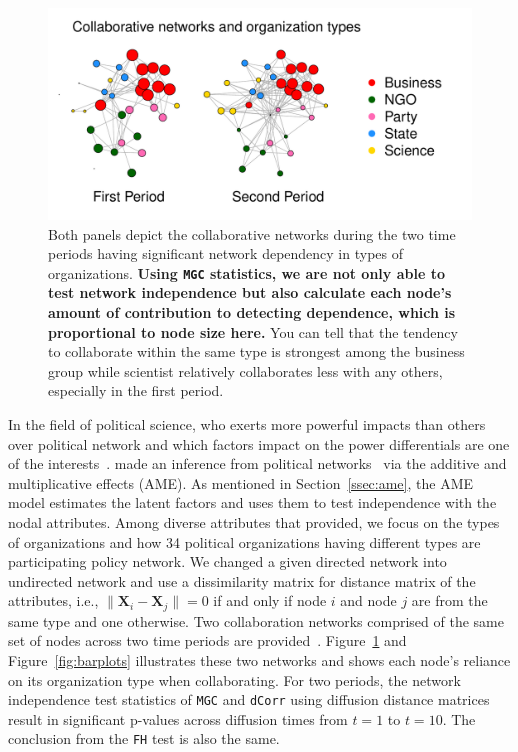 \documentclass[12pt]{article}
\theoremstyle{definition}
\begin{document}
\begin{figure}[H]
	\centering
	\includegraphics[width=\linewidth]{../../Figure/two_politics.pdf}
	\caption{Both panels depict the collaborative networks during the two time periods having significant network dependency in types of organizations. \textbf{Using \texttt{MGC} statistics, we are not only able to test network independence but also calculate each node's amount of contribution to detecting dependence, which is proportional to node size here.} You can tell that the tendency to collaborate within the same type is strongest among the business group while scientist relatively collaborates less with any others, especially in the first period.}
	\label{fig:politics}
\end{figure}
	
In the field of political science, who exerts more powerful impacts than others over political network and which factors impact on the power differentials are one of the interests~\citep{ingold2014structural}. \cite{minhas2016inferential} made an inference from political networks~\citep{cranmer2016navigating} via the additive and multiplicative effects (AME). As mentioned in Section~\ref{ssec:ame}, the AME model estimates the latent factors and uses them to test independence with the nodal attributes. Among diverse attributes that \cite{cranmer2016navigating} provided, we focus on the types of organizations and how 34 political organizations having different types are participating policy network. We changed a given directed network into undirected network and use a dissimilarity matrix for distance matrix of the attributes, i.e., $\parallel \mathbf{X}_{i}  - \mathbf{X}_{j} \parallel = 0$ if and only if node $i$ and node $j$ are from the same type and one otherwise. Two collaboration networks comprised of the same set of nodes across two time periods are provided~\citep{ingold2014structural}. Figure~\ref{fig:politics} and Figure~\ref{fig:barplots} illustrates these two networks and shows each node's reliance on its organization type when collaborating. For two periods, the network independence test statistics of \texttt{MGC} and \texttt{dCorr} using diffusion distance matrices result in significant p-values across diffusion times from $t=1$ to $t=10$. The conclusion from the \texttt{FH} test is also the same.  
\end{document}
